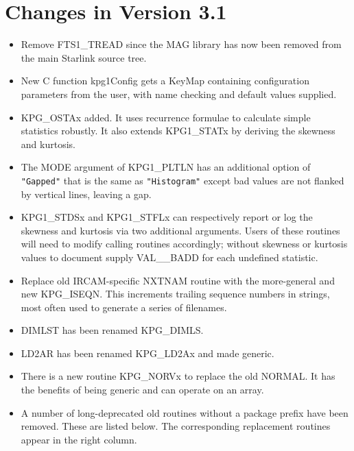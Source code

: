 \section{Changes in Version 3.1}
\begin{itemize}
\item Remove FTS1\_TREAD since the MAG library has now been removed
      from the main Starlink source tree.
\item New C function kpg1Config gets a KeyMap containing configuration
      parameters from the user, with name checking and default values
      supplied.
\item KPG\_OSTAx added.  It uses recurrence formulae to calculate
      simple statistics robustly.  It also extends KPG1\_STATx by
      deriving the skewness and kurtosis.
\item The MODE argument of KPG1\_PLTLN has an additional option of
      {\tt "Gapped"} that is the same as {\tt "Histogram"} except
      bad values are not flanked by vertical lines, leaving a gap.
\item KPG1\_STDSx and KPG1\_STFLx can respectively report or log the
      skewness and kurtosis via two additional arguments.  Users of
      these routines will need to modify calling routines accordingly;
      without skewness or kurtosis values to document supply
      VAL\_\_BADD for each undefined statistic.
\item Replace old IRCAM-specific NXTNAM routine with the more-general
      and new KPG\_ISEQN.  This increments trailing sequence numbers
      in strings, most often used to generate a series of filenames.
\item DIMLST has been renamed KPG\_DIMLS.
\item LD2AR has been renamed KPG\_LD2Ax and made generic.
\item There is a new routine KPG\_NORVx to replace the old NORMAL.  It
      has the benefits of being generic and can operate on an array.
\item A number of long-deprecated old routines without a package prefix
      have been removed.  These are listed below.  The corresponding 
      replacement routines appear in the right column.


\end{itemize}
